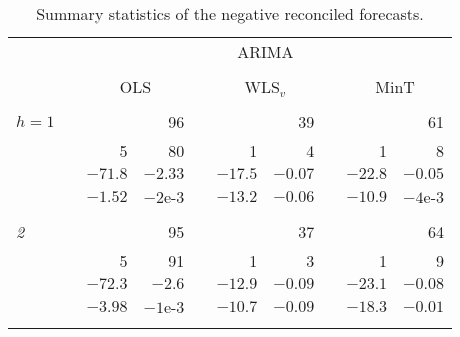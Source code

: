 \documentclass[11pt]{article}
\newcommand{\0}{\phantom{0}}
\begin{document}
\begin{table}[!htbp]
	\centering
	\fontsize{9}{12}\rm\tabcolsep=0.18cm
	\caption{Summary statistics of the negative reconciled forecasts.}
	\label{tbl:summaryneg}
	\begin{threeparttable}
		\begin{tabular}{lrrrrrrrrr}
			\toprule
			         &  & \multicolumn{8}{c}{ARIMA}                                                                                                        \\
			\cline{3-10}                                                                                                                                   \\[-0.3cm]
			         &  & \multicolumn{2}{c}{OLS}   &         & \multicolumn{2}{c}{WLS$_{v}$} &         & \multicolumn{2}{c}{MinT}                         \\
			\cline{3-4} \cline{6-7} \cline{9-10}                                                                                                           \\[-0.3cm]
			$h = 1$  &  &                           & 96      &                               &         & 39                       &  &          & 61      \\
			         &  & 5                         & 80      &                               & 1       & 4                        &  & 1        & 8       \\
			         &  & $-71.8$                   & $-2.33$ &                               & $-17.5$ & $-0.07$                  &  & $-22.8$  & $-0.05$ \\
			         &  & $-1.52$                   & $-2$e-3 &                               & $-13.2$ & $-0.06$                  &  & $-10.9$  & $-4$e-3 \\ \\[-0.3cm]

			{\it 2}  &  &                           & 95      &                               &         & 37                       &  &          & 64      \\
			         &  & 5                         & 91      &                               & 1       & 3                        &  & 1        & 9       \\
			         &  & $-72.3$                   & $-2.6$  &                               & $-12.9$ & $-0.09$                  &  & $-23.1$  & $-0.08$ \\
			         &  & $-3.98$                   & $-1$e-3 &                               & $-10.7$ & $-0.09$                  &  & $-18.3$  & $-0.01$ \\ \\[-0.3cm]


\end{tabular}
\end{threeparttable}
\end{table}
\end{document}
